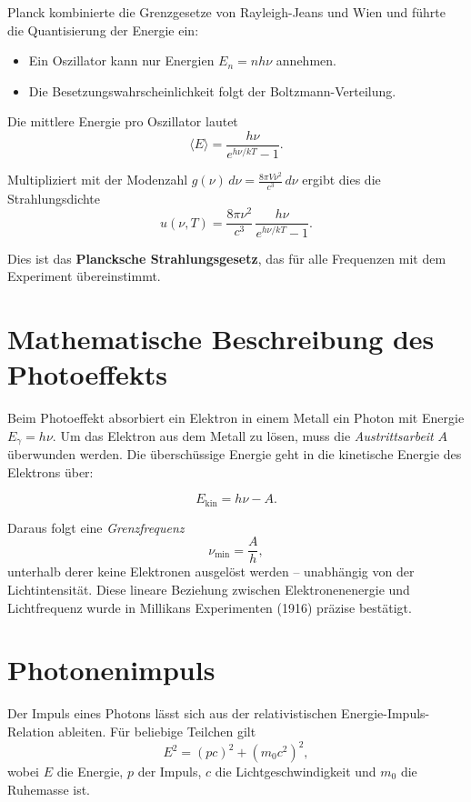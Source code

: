 Planck kombinierte die Grenzgesetze von Rayleigh-Jeans und Wien und
führte die Quantisierung der Energie ein:

\begin{itemize}
	\item Ein Oszillator kann nur Energien $E_n = nh\nu$ annehmen.
	\item Die Besetzungswahrscheinlichkeit folgt der Boltzmann-Verteilung.
\end{itemize}

Die mittlere Energie pro Oszillator lautet
\[
\langle E \rangle = \frac{h\nu}{e^{h\nu/kT} - 1}.
\]

Multipliziert mit der Modenzahl
$g(\nu)\, d\nu = \tfrac{8\pi V \nu^2}{c^3}\, d\nu$
ergibt dies die Strahlungsdichte
\[
u(\nu, T) = \frac{8\pi \nu^2}{c^3}\,
\frac{h\nu}{e^{h\nu/kT} - 1}.
\]

Dies ist das \textbf{Plancksche Strahlungsgesetz}, das für alle Frequenzen
mit dem Experiment übereinstimmt.

\section{Mathematische Beschreibung des Photoeffekts}
\label{anhangA:photoeffekt}

Beim Photoeffekt absorbiert ein Elektron in einem Metall ein Photon
mit Energie $E_\gamma = h\nu$. Um das Elektron aus dem Metall zu lösen,
muss die \emph{Austrittsarbeit} $A$ überwunden werden. Die überschüssige
Energie geht in die kinetische Energie des Elektrons über:

\[
E_\text{kin} = h\nu - A.
\]

Daraus folgt eine \emph{Grenzfrequenz}
\[
\nu_\text{min} = \frac{A}{h},
\]
unterhalb derer keine Elektronen ausgelöst werden – unabhängig von der
Lichtintensität. Diese lineare Beziehung zwischen Elektronenenergie und
Lichtfrequenz wurde in Millikans Experimenten (1916) präzise bestätigt.
\section{Photonenimpuls}
\label{anhangA:impuls}

Der Impuls eines Photons lässt sich aus der relativistischen Energie-Impuls-Relation ableiten. Für beliebige Teilchen gilt
\[
E^2 = (pc)^2 + (m_0 c^2)^2 ,
\]
wobei $E$ die Energie, $p$ der Impuls, $c$ die Lichtgeschwindigkeit und $m_0$ die Ruhemasse ist.

